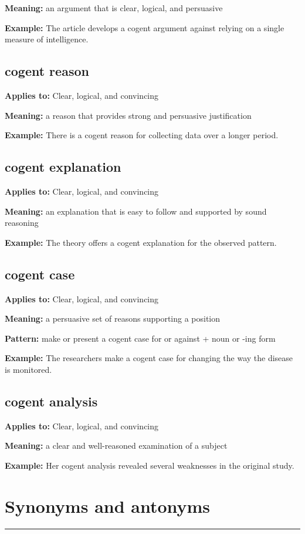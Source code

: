 \documentclass[11pt]{article}
\newcommand{\sectionrule}{\par\vspace{-0.5em}\noindent\textcolor{Accent}{\rule{\linewidth}{0.6pt}}\par}
\begin{document}
\textbf{Meaning:} an argument that is clear, logical, and persuasive

\textbf{Example:} The article develops a cogent argument against relying on a single measure of intelligence.

\subsection{cogent reason}
\textbf{Applies to:} Clear, logical, and convincing

\textbf{Meaning:} a reason that provides strong and persuasive justification

\textbf{Example:} There is a cogent reason for collecting data over a longer period.

\subsection{cogent explanation}
\textbf{Applies to:} Clear, logical, and convincing

\textbf{Meaning:} an explanation that is easy to follow and supported by sound reasoning

\textbf{Example:} The theory offers a cogent explanation for the observed pattern.

\subsection{cogent case}
\textbf{Applies to:} Clear, logical, and convincing

\textbf{Meaning:} a persuasive set of reasons supporting a position

\textbf{Pattern:} make or present a cogent case for or against + noun or -ing form

\textbf{Example:} The researchers make a cogent case for changing the way the disease is monitored.

\subsection{cogent analysis}
\textbf{Applies to:} Clear, logical, and convincing

\textbf{Meaning:} a clear and well-reasoned examination of a subject

\textbf{Example:} Her cogent analysis revealed several weaknesses in the original study.

\section{Synonyms and antonyms}
\sectionrule
\end{document}
